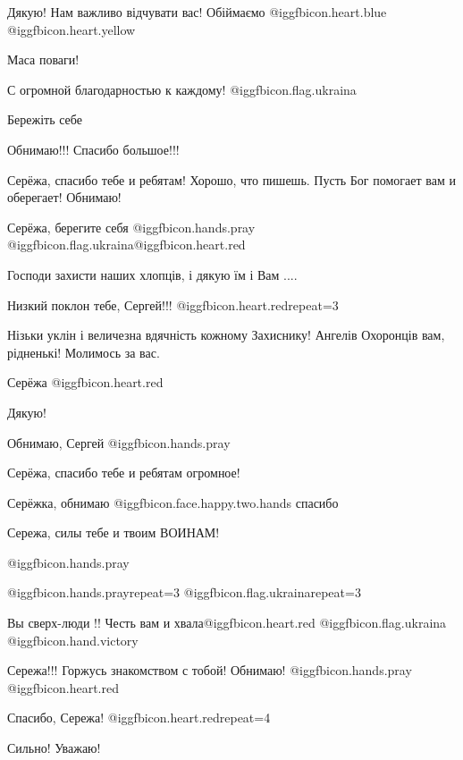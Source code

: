 \begin{itemize}
Дякую! Нам важливо відчувати вас! Обіймаємо @igg{fbicon.heart.blue}  @igg{fbicon.heart.yellow} 

Маса поваги!

С огромной благодарностью к каждому! @igg{fbicon.flag.ukraina}

Бережіть себе

Обнимаю!!! Спасибо большое!!!

Серёжа, спасибо тебе и ребятам! Хорошо, что пишешь. Пусть Бог помогает вам и оберегает! Обнимаю!

Серёжа, берегите себя  @igg{fbicon.hands.pray} @igg{fbicon.flag.ukraina}@igg{fbicon.heart.red}

Господи захисти наших хлопців, і дякую їм і Вам ....

Низкий поклон тебе, Сергей!!! @igg{fbicon.heart.red}{repeat=3}

Нізьки уклін і величезна вдячність кожному Захиснику! Ангелів Охоронців вам, рідненькі! Молимось за вас.

Серёжа @igg{fbicon.heart.red}

Дякую!

Обнимаю, Сергей  @igg{fbicon.hands.pray} 

Серёжа, спасибо тебе и ребятам огромное!

Серёжка, обнимаю  @igg{fbicon.face.happy.two.hands} спасибо

Сережа, силы тебе и твоим ВОИНАМ!

 @igg{fbicon.hands.pray} 

 @igg{fbicon.hands.pray}{repeat=3} @igg{fbicon.flag.ukraina}{repeat=3}

Вы сверх-люди !!
Честь вам и хвала@igg{fbicon.heart.red} @igg{fbicon.flag.ukraina} @igg{fbicon.hand.victory}🔱

Сережа!!! Горжусь знакомством с тобой! Обнимаю! @igg{fbicon.hands.pray} @igg{fbicon.heart.red}

Спасибо, Сережа! @igg{fbicon.heart.red}{repeat=4}

Сильно! Уважаю!

\end{itemize} %
